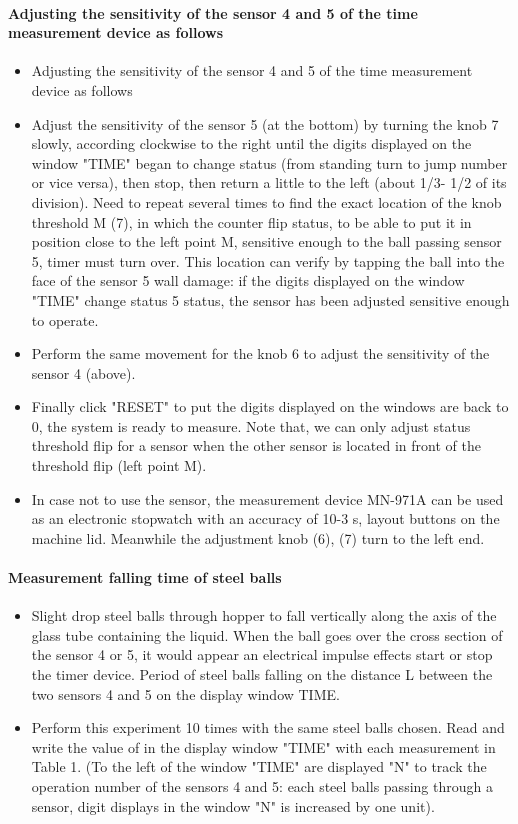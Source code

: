 \paragraph{Adjusting the sensitivity of the sensor 4 and 5 of the time measurement device as follows}
\begin{itemize}
    \item Adjusting the sensitivity of the sensor 4 and 5 of the time measurement device as follows
    \item Adjust the sensitivity of the sensor 5 (at the bottom) by turning the knob 7 slowly, according clockwise to the right until the digits displayed on the window "TIME" began to change status (from standing turn to jump number or vice versa), then stop, then return a little to the left (about 1/3- 1/2 of its division). Need to repeat several times to find the exact location of the knob threshold M (7), in which the counter flip status, to be able to put it in position close to the left point M, sensitive enough to the ball passing sensor 5, timer must turn over. This location can verify by tapping the ball into the face of the sensor 5 wall damage: if the digits displayed on the window "TIME" change status 5 status, the sensor has been adjusted sensitive enough to operate.
    \item Perform the same movement for the knob 6 to adjust the sensitivity of the sensor 4 (above). 
    \item Finally click "RESET" to put the digits displayed on the windows are back to 0, the system is ready to measure. Note that, we can only adjust status threshold flip for a sensor when the other sensor is located in front of the threshold flip (left point M).
    \item In case not to use the sensor, the measurement device MN-971A can be used as an electronic stopwatch with an accuracy of 10-3 s, layout buttons on the machine lid. Meanwhile the adjustment knob (6), (7) turn to the left end.
\end{itemize}

\paragraph{Measurement falling time of steel balls}
\begin{itemize}
    \item Slight drop steel balls through hopper to fall vertically along the axis of the glass tube containing the liquid. When the ball goes over the cross section of the sensor 4 or 5, it would appear an electrical impulse effects start or stop the timer device. Period of steel balls  falling on the distance L between the two sensors 4 and 5 on the display window TIME. 
    \item Perform this experiment 10 times with the same steel balls chosen. Read and write the value of  in the display window "TIME" with each measurement in Table 1. (To the left of the window "TIME" are displayed "N" to track the operation number of the sensors 4 and 5: each steel balls passing through a sensor, digit displays in the window "N" is increased by one unit).
\end{itemize}

